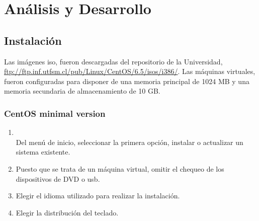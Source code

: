 \documentclass[11pt]{article}
\begin{document}
\section{Análisis y Desarrollo}
\subsection{Instalación}
Las imágenes iso, fueron descargadas del repositorio de la Universidad, \url{ftp://ftp.inf.utfsm.cl/pub/Linux/CentOS/6.5/isos/i386/}. Las máquinas virtuales, fueron configuradas para disponer de una memoria principal de 1024 MB y una memoria secundaria de almacenamiento de 10 GB.
	\subsubsection{CentOS minimal version}
		\begin{enumerate}
			\item 
				\begin{minipage}[t]{\linewidth}
			          \raggedright
			          \medskip
			          \\Del menú de inicio, seleccionar la primera opción, instalar o actualizar un sistema existente.
			    \end{minipage}
			
			\item Puesto que se trata de un máquina virtual, omitir el chequeo de los dispositivos de DVD o usb.
			\item Elegir el idioma utilizado para realizar la instalación.
			\item Elegir la distribución del teclado.


\end{enumerate}
\end{document}
